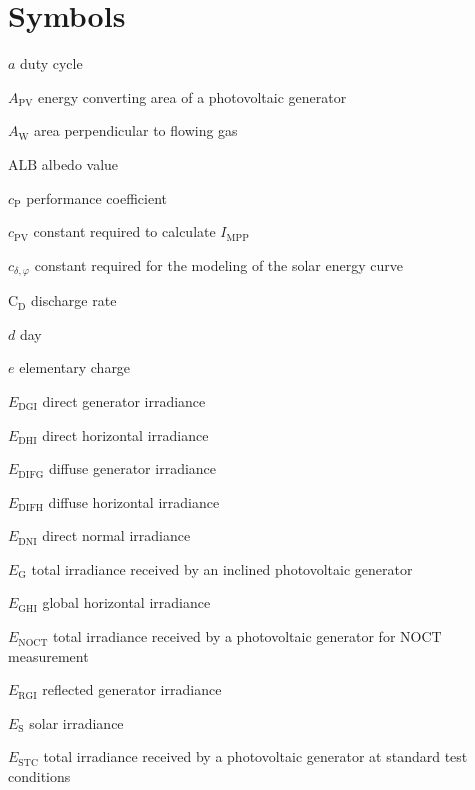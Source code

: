 
\chapter*{Symbols}
 
\begin{symb} %

\item[$a$]								duty cycle
\item[$A_\mathrm{PV}$]					energy converting area of a photovoltaic generator
\item[$A_\mathrm{W}$]					area perpendicular to flowing gas
\item[$\mathrm{ALB}$]					albedo value
\item[$c_\mathrm{P}$]					performance coefficient
\item[$c_\mathrm{PV}$]					constant required to calculate $I_\mathrm{MPP}$
\item[$c_{\delta,\varphi}$]				constant required for the modeling of the solar energy curve
\item[$\mathrm{C_D}$]					discharge rate
\item[$d$]								day
\item[$e$]								elementary charge
\item[$E_\mathrm{DGI}$]					direct generator irradiance
\item[$E_\mathrm{DHI}$]					direct horizontal irradiance
\item[$E_\mathrm{DIFG}$]				diffuse generator irradiance
\item[$E_\mathrm{DIFH}$]				diffuse horizontal irradiance
\item[$E_\mathrm{DNI}$]					direct normal irradiance
\item[$E_\mathrm{G}$]					total irradiance received by an inclined photovoltaic generator
\item[$E_\mathrm{GHI}$]					global horizontal irradiance
\item[$E_\mathrm{NOCT}$]				total irradiance received by a photovoltaic generator for $\mathrm{NOCT}$ measurement
\item[$E_\mathrm{RGI}$]					reflected generator irradiance
\item[$E_\mathrm{S}$]					solar irradiance
\item[$E_\mathrm{STC}$]					total irradiance received by a photovoltaic generator at standard test conditions

\end{symb}
